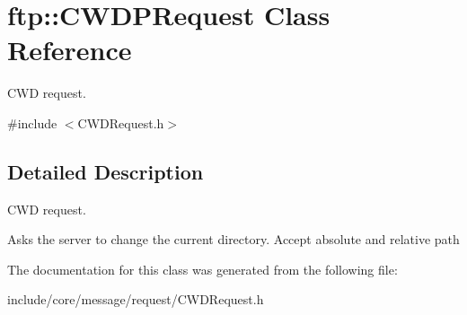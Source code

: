 \hypertarget{classftp_1_1_c_w_d_p_request}{\section{ftp\-:\-:C\-W\-D\-P\-Request Class Reference}
\label{classftp_1_1_c_w_d_p_request}
}


C\-W\-D request.  




{\ttfamily \#include $<$C\-W\-D\-Request.\-h$>$}



\subsection{Detailed Description}
C\-W\-D request. 

Asks the server to change the current directory. Accept absolute and relative path 

The documentation for this class was generated from the following file\-:\begin{DoxyCompactItemize}
\item 
include/core/message/request/C\-W\-D\-Request.\-h\end{DoxyCompactItemize}
